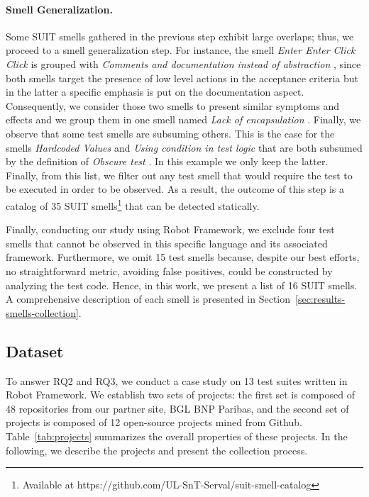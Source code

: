 \paragraph{\textbf{Smell Generalization.}}
Some SUIT smells gathered in the previous step exhibit large overlaps; thus, we proceed to a smell generalization step. For instance, the smell \emph{Enter Enter Click Click} \cite{Buwalda2015} is grouped with \emph{Comments and documentation instead of abstraction} \cite{Klarck2014}, since both smells target the presence of low level actions in the acceptance criteria but in the latter a specific emphasis is put on the documentation aspect. Consequently, we consider those two smells to present similar symptoms and effects and we group them in one smell named \emph{Lack of encapsulation} \cite{Chen2012, Klarck2014, Buwalda2015, England2016, Renaudin2016}. Finally, we observe that some test smells are subsuming others. This is the case for the smells \emph{Hardcoded Values} and \emph{Using condition in test logic} that are both subsumed by the definition of \emph{Obscure test} \cite{Hauptmann2013, Gawinecki2016, Siminiuc2019}. In this example we only keep the latter.  Finally, from this list, we filter out any test smell that would require the test to be executed in order to be observed. As a result, the outcome of this step is a catalog of 35 SUIT smells\footnote{Available at https://github.com/UL-SnT-Serval/suit-smell-catalog} that can be detected statically.

Finally, conducting our study using Robot Framework, we exclude four test smells that cannot be observed in this specific language and its associated framework. Furthermore, we omit 15 test smells because, despite our best efforts, no straightforward metric, avoiding false positives, could be constructed by analyzing the test code. Hence, in this work, we present a list of 16 SUIT smells. A comprehensive description of each smell is presented in Section~\ref{sec:results-smells-collection}.

\subsection{Dataset}
\label{sec:data-collection}
To answer RQ2 and RQ3, we conduct a case study on 13 test suites written in Robot Framework. We establish two sets of projects: the first set is composed of 48 repositories from our partner site, BGL BNP Paribas, and the second set of projects is composed of 12 open-source projects mined from Github. Table~\ref{tab:projects} summarizes the overall properties of these projects. In the following, we describe the projects and present the collection process. 

